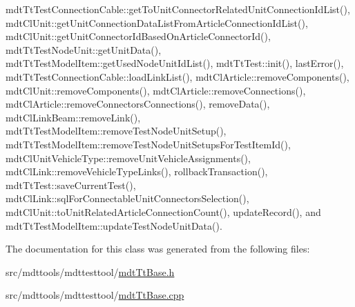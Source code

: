 mdt\-Tt\-Test\-Connection\-Cable\-::get\-To\-Unit\-Connector\-Related\-Unit\-Connection\-Id\-List(), mdt\-Cl\-Unit\-::get\-Unit\-Connection\-Data\-List\-From\-Article\-Connection\-Id\-List(), mdt\-Cl\-Unit\-::get\-Unit\-Connector\-Id\-Based\-On\-Article\-Connector\-Id(), mdt\-Tt\-Test\-Node\-Unit\-::get\-Unit\-Data(), mdt\-Tt\-Test\-Model\-Item\-::get\-Used\-Node\-Unit\-Id\-List(), mdt\-Tt\-Test\-::init(), last\-Error(), mdt\-Tt\-Test\-Connection\-Cable\-::load\-Link\-List(), mdt\-Cl\-Article\-::remove\-Components(), mdt\-Cl\-Unit\-::remove\-Components(), mdt\-Cl\-Article\-::remove\-Connections(), mdt\-Cl\-Article\-::remove\-Connectors\-Connections(), remove\-Data(), mdt\-Cl\-Link\-Beam\-::remove\-Link(), mdt\-Tt\-Test\-Model\-Item\-::remove\-Test\-Node\-Unit\-Setup(), mdt\-Tt\-Test\-Model\-Item\-::remove\-Test\-Node\-Unit\-Setups\-For\-Test\-Item\-Id(), mdt\-Cl\-Unit\-Vehicle\-Type\-::remove\-Unit\-Vehicle\-Assignments(), mdt\-Cl\-Link\-::remove\-Vehicle\-Type\-Links(), rollback\-Transaction(), mdt\-Tt\-Test\-::save\-Current\-Test(), mdt\-Cl\-Link\-::sql\-For\-Connectable\-Unit\-Connectors\-Selection(), mdt\-Cl\-Unit\-::to\-Unit\-Related\-Article\-Connection\-Count(), update\-Record(), and mdt\-Tt\-Test\-Model\-Item\-::update\-Test\-Node\-Unit\-Data().



The documentation for this class was generated from the following files\-:\begin{DoxyCompactItemize}
\item 
src/mdttools/mdttesttool/\hyperlink{mdt_tt_base_8h}{mdt\-Tt\-Base.\-h}\item 
src/mdttools/mdttesttool/\hyperlink{mdt_tt_base_8cpp}{mdt\-Tt\-Base.\-cpp}\end{DoxyCompactItemize}
